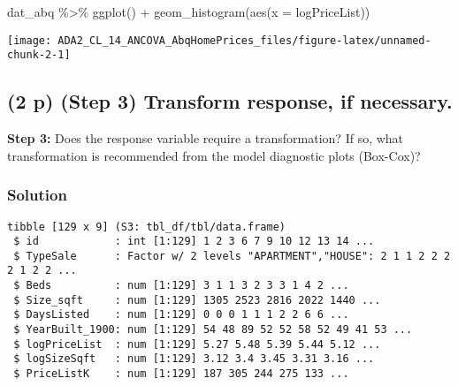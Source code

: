 \documentclass[
  12pt,
]{article}
\newenvironment{Shaded}{\begin{snugshade}}{\end{snugshade}}
\newcommand{\AttributeTok}[1]{\textcolor[rgb]{0.77,0.63,0.00}{#1}}
\newcommand{\CommentTok}[1]{\textcolor[rgb]{0.56,0.35,0.01}{\textit{#1}}}
\newcommand{\DecValTok}[1]{\textcolor[rgb]{0.00,0.00,0.81}{#1}}
\newcommand{\FunctionTok}[1]{\textcolor[rgb]{0.00,0.00,0.00}{#1}}
\newcommand{\NormalTok}[1]{#1}
\newcommand{\OtherTok}[1]{\textcolor[rgb]{0.56,0.35,0.01}{#1}}
\newcommand{\SpecialCharTok}[1]{\textcolor[rgb]{0.00,0.00,0.00}{#1}}
\begin{document}
\begin{Shaded}
\begin{Highlighting}[]
\NormalTok{dat\_abq }\SpecialCharTok{\%\textgreater{}\%}
  \FunctionTok{ggplot}\NormalTok{() }\SpecialCharTok{+} 
  \FunctionTok{geom\_histogram}\NormalTok{(}\FunctionTok{aes}\NormalTok{(}\AttributeTok{x =}\NormalTok{ logPriceList))}
\end{Highlighting}
\end{Shaded}

\begin{center}\texttt{[image: ADA2\_CL\_14\_ANCOVA\_AbqHomePrices\_files/figure-latex/unnamed-chunk-2-1]} \end{center}

\hypertarget{p-step-3-transform-response-if-necessary.}{%
\subsection{\texorpdfstring{\textbf{(2 p)} (Step 3) Transform response,
if
necessary.}{(2 p) (Step 3) Transform response, if necessary.}}\label{p-step-3-transform-response-if-necessary.}}

\textbf{Step 3:} Does the response variable require a transformation? If
so, what transformation is recommended from the model diagnostic plots
(Box-Cox)?

\hypertarget{solution}{%
\subsubsection{Solution}\label{solution}}

\begin{Shaded}
\end{Shaded}

\begin{verbatim}
tibble [129 x 9] (S3: tbl_df/tbl/data.frame)
 $ id            : int [1:129] 1 2 3 6 7 9 10 12 13 14 ...
 $ TypeSale      : Factor w/ 2 levels "APARTMENT","HOUSE": 2 1 1 2 2 2 2 1 2 2 ...
 $ Beds          : num [1:129] 3 1 1 3 2 3 3 1 4 2 ...
 $ Size_sqft     : num [1:129] 1305 2523 2816 2022 1440 ...
 $ DaysListed    : num [1:129] 0 0 0 1 1 1 2 2 6 6 ...
 $ YearBuilt_1900: num [1:129] 54 48 89 52 52 58 52 49 41 53 ...
 $ logPriceList  : num [1:129] 5.27 5.48 5.39 5.44 5.12 ...
 $ logSizeSqft   : num [1:129] 3.12 3.4 3.45 3.31 3.16 ...
 $ PriceListK    : num [1:129] 187 305 244 275 133 ...
\end{verbatim}
\end{document}
